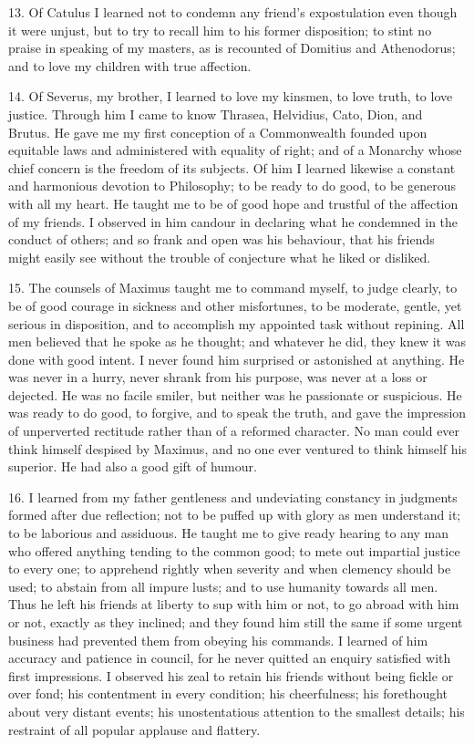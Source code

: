 \documentclass{book}
\begin{document}
13. Of Catulus I learned not to condemn any friend's expostulation
even though it were unjust, but to try to recall him to his former
disposition; to stint no praise in speaking of my masters, as is
recounted of Domitius and Athenodorus; and to love my children with
true affection.

14. Of Severus, my brother, I learned to love my kinsmen, to love
truth, to love justice. Through him I came to know Thrasea, Helvidius,
Cato, Dion, and Brutus. He gave me my first conception of a
Commonwealth founded upon equitable laws and administered with
equality of right; and of a Monarchy whose chief concern is the
freedom of its subjects. Of him I learned likewise a constant and
harmonious devotion to Philosophy; to be ready to do good, to be
generous with all my heart. He taught me to be of good hope and
trustful of the affection of my friends. I observed in him candour in
declaring what he condemned in the conduct of others; and so frank and
open was his behaviour, that his friends might easily see without the
trouble of conjecture what he liked or disliked.

15. The counsels of Maximus taught me to command myself, to judge
clearly, to be of good courage in sickness and other misfortunes, to
be moderate, gentle, yet serious in disposition, and to accomplish my
appointed task without repining. All men believed that he spoke as he
thought; and whatever he did, they knew it was done with good intent.
I never found him surprised or astonished at anything. He was never in
a hurry, never shrank from his purpose, was never at a loss or
dejected. He was no facile smiler, but neither was he passionate or
suspicious. He was ready to do good, to forgive, and to speak the
truth, and gave the impression of unperverted rectitude rather than of
a reformed character. No man could ever think himself despised by
Maximus, and no one ever ventured to think himself his superior. He
had also a good gift of humour.

16. I learned from my father gentleness and undeviating constancy in
judgments formed after due reflection; not to be puffed up with glory
as men understand it; to be laborious and assiduous. He taught me to
give ready hearing to any man who offered anything tending to the common
good; to mete out impartial justice to every one; to apprehend rightly
when severity and when clemency should be used; to abstain from all
impure lusts; and to use humanity towards all men. Thus he left his
friends at liberty to sup with him or not, to go abroad with him or
not, exactly as they inclined; and they found him still the same if
some urgent business had prevented them from obeying his commands. I
learned of him accuracy and patience in council, for he never quitted an
enquiry satisfied with first impressions. I observed his zeal to retain
his friends without being fickle or over fond; his contentment in every
condition; his cheerfulness; his forethought about very distant events;
his unostentatious attention to the smallest details; his restraint of
all popular applause and flattery.
\end{document}
